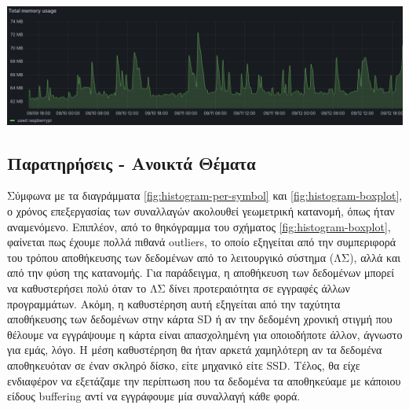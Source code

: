 \documentclass[11pt]{article}
\begin{document}
\begin{center}
\includegraphics[width=0.7\linewidth]{./images/memory-usage.png}
\end{center}
\subsection{Παρατηρήσεις - Ανοικτά Θέματα}
\label{sec:org1cc43ab}
Σύμφωνα με τα διαγράμματα \ref{fig:histogram-per-symbol} και \ref{fig:histogram-boxplot}, ο χρόνος επεξεργασίας των συναλλαγών ακολουθεί γεωμετρική κατανομή, όπως ήταν αναμενόμενο. Επιπλέον, από το θηκόγραμμα του σχήματος \ref{fig:histogram-boxplot}, φαίνεται πως έχουμε πολλά πιθανά outliers, το οποίο εξηγείται από την συμπεριφορά του τρόπου αποθήκευσης των δεδομένων από το λειτουργικό σύστημα (ΛΣ), αλλά και από την φύση της κατανομής. Για παράδειγμα, η αποθήκευση των δεδομένων μπορεί να καθυστερήσει πολύ όταν το ΛΣ δίνει προτεραιότητα σε εγγραφές άλλων προγραμμάτων. Ακόμη, η καθυστέρηση αυτή εξηγείται από την ταχύτητα αποθήκευσης των δεδομένων στην κάρτα SD ή αν την δεδομένη χρονική στιγμή που θέλουμε να εγγράψουμε η κάρτα είναι απασχολημένη για οποιοδήποτε άλλον, άγνωστο για εμάς, λόγο. Η μέση καθυστέρηση θα ήταν αρκετά χαμηλότερη αν τα δεδομένα αποθηκευόταν σε έναν σκληρό δίσκο, είτε μηχανικό είτε SSD. Τέλος, θα είχε ενδιαφέρον να εξετάζαμε την περίπτωση που τα δεδομένα τα αποθηκεύαμε με κάποιου είδους buffering αντί να εγγράφουμε μία συναλλαγή κάθε φορά.

\printbibliography[heading=bibnumbered]
\end{document}
